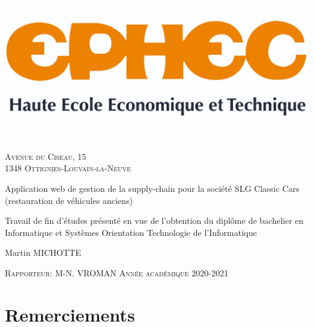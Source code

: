 \documentclass[french, 12pt, a4paper]{article}
\begin{document}

\begin{titlepage}
\begin{center}

\includegraphics[width=15cm]{img/ephec.jpg}~\\
\textsc{Avenue du Ciseau, 15 \\ 1348 Ottignies-Louvain-la-Neuve} \\[1.5cm]

{\huge \bfseries \begin{spacing}{1.25}
  Application web \linebreak 
  de gestion de la supply-chain \linebreak
  pour la société SLG Classic Cars \linebreak
  \LARGE(restauration de véhicules anciens)
  \\[2cm]
  \end{spacing} 
} 

{\large 
  Travail de fin d'études présenté en vue de l'obtention du diplôme de bachelier
  en Informatique et Systèmes Orientation Technologie de l'Informatique
  \\[2cm]
}

{\LARGE 
  Martin MICHOTTE
}

\vspace*{\fill}
\textsc{\large Rapporteur: M-N. VROMAN}
\hfill
\textsc{\large Année académique 2020-2021}

\end{center}
\end{titlepage}


\newpage
\setcounter{page}{0}
\section*{Remerciements}
\end{document}
